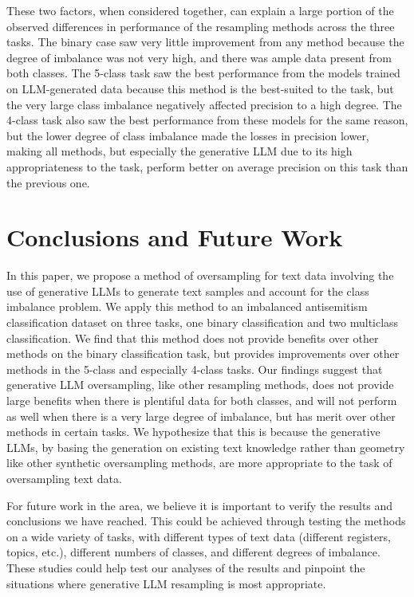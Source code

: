 \documentclass[runningheads]{llncs}
\begin{document}
These two factors, when considered together, can explain a large portion of the observed differences in performance of the resampling methods across the three tasks. The binary case saw very little improvement from any method because the degree of imbalance was not very high, and there was ample data present from both classes. The 5-class task saw the best performance from the models trained on LLM-generated data because this method is the best-suited to the task, but the very large class imbalance negatively affected precision to a high degree. The 4-class task also saw the best performance from these models for the same reason, but the lower degree of class imbalance made the losses in precision lower, making all methods, but especially the generative LLM due to its high appropriateness to the task, perform better on average precision on this task than the previous one.

\section{Conclusions and Future Work}
In this paper, we propose a method of oversampling for text data involving the use of generative LLMs to generate text samples and account for the class imbalance problem. We apply this method to an imbalanced antisemitism classification dataset on three tasks, one binary classification and two multiclass classification. We find that this method does not provide benefits over other methods on the binary classification task, but provides improvements over other methods in the 5-class and especially 4-class tasks. Our findings suggest that generative LLM oversampling, like other resampling methods, does not provide large benefits when there is plentiful data for both classes, and will not perform as well when there is a very large degree of imbalance, but has merit over other methods in certain tasks. We hypothesize that this is because the generative LLMs, by basing the generation on existing text knowledge rather than geometry like other synthetic oversampling methods, are more appropriate to the task of oversampling text data.

For future work in the area, we believe it is important to verify the results and conclusions we have reached. This could be achieved through testing the methods on a wide variety of tasks, with different types of text data (different registers, topics, etc.), different numbers of classes, and different degrees of imbalance. These studies could help test our analyses of the results and pinpoint the situations where generative LLM resampling is most appropriate.
\end{document}
